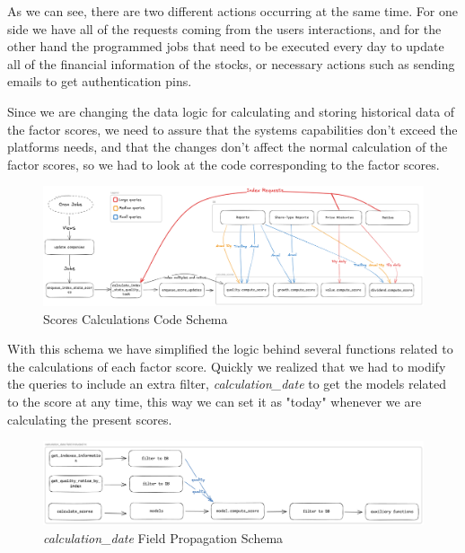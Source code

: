 \documentclass[11pt,english,a4paper,hidelinks]{book}
\begin{document}
\noindent As we can see, there are two different actions occurring at the same time. For one side we have all of the requests coming from the users interactions, and for the other hand the programmed jobs that need to be executed every day to update all of the financial information of the stocks, or necessary actions such as sending emails to get authentication pins.

\vspace{0.5cm}
\noindent Since we are changing the data logic for calculating and storing historical data of the factor scores, we need to assure that the systems capabilities don't exceed the platforms needs, and that the changes don't affect the normal calculation of the factor scores, so we had to look at the code corresponding to the factor scores.

\begin{figure}[H]
    \centering
    \includegraphics[width=1\textwidth]{images/tweenvest/scores schema.png}
    \caption{Scores Calculations Code Schema}
    \label{fig:scores_schema}
\end{figure}

\noindent With this schema we have simplified the logic behind several functions related to the calculations of each factor score. Quickly we realized that we had to modify the queries to include an extra filter, \textit{calculation\_date} to get the models related to the score at any time, this way we can set it as "today" whenever we are calculating the present scores.


\begin{figure}[H]
    \centering
    \includegraphics[width=1\textwidth]{images/tweenvest/Propagation Schema.png}
    \caption{\textit{calculation\_date} Field Propagation Schema}
    \label{fig:propagation_schema}
\end{figure}
\end{document}
